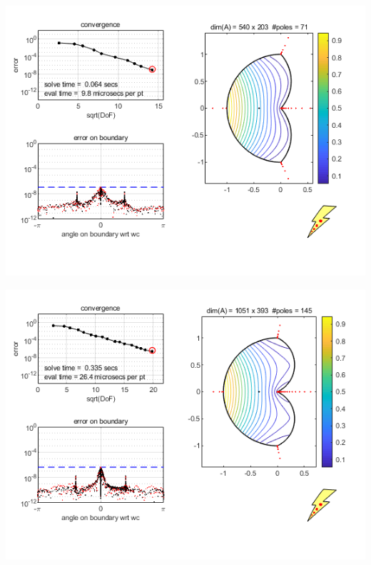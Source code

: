 \documentclass{seminar}
\begin{document}
\begin{slide} %
\begin{center}
\includegraphics[scale=0.7]{./PNG/cusp1}
\end{center}
\end{slide}
\begin{slide}
\begin{center}
\includegraphics[scale=0.7]{./PNG/cusp2}
\end{center}
\end{slide}
\end{document}
